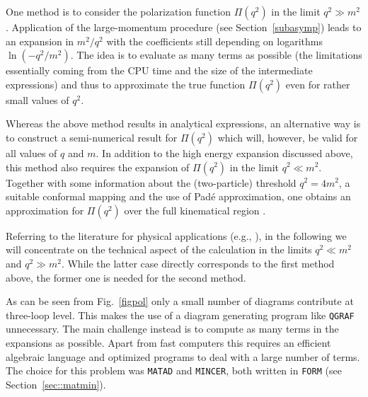 One method is to consider the polarization function $\Pi(q^2)$ in the
limit $q^2\gg m^2$. Application of the large-momentum procedure (see
Section~\ref{subasymp}) leads to an expansion in $m^2/q^2$ with the
coefficients still depending on logarithms $\ln(-q^2/m^2)$.  The idea is
to evaluate as many terms as possible (the limitations essentially
coming from the CPU time and the size of the intermediate expressions)
and thus to approximate the true function $\Pi(q^2)$ even for rather
small values of $q^2$.

Whereas the above method results in analytical expressions, an
alternative way is to construct a semi-numerical result for $\Pi(q^2)$
which will, however, be valid for all values of $q$ and $m$. In addition
to the high energy expansion discussed above, this method also requires
the expansion of $\Pi(q^2)$ in the limit $q^2\ll m^2$.  Together
with some information about the (two-particle) threshold $q^2=4m^2$, a
suitable conformal mapping and the use of Pad\'e approximation, one
obtains an approximation for $\Pi(q^2)$ over the full kinematical region
\cite{CheKueSte96,CheHarSte98}.

Referring to the literature for physical applications (e.g.,
\cite{ckk96,chkst98}), in the following we will concentrate on the
technical aspect of the calculation in the limits $q^2\ll m^2$ and
$q^2\gg m^2$. While the latter case directly corresponds to the first
method above, the former one is needed for the second method.

As can be seen from Fig.~\ref{figpol} only a small number of diagrams
contribute at three-loop level. This makes the use of a diagram generating
program like {\tt QGRAF} unnecessary.  The main challenge instead is to
compute as many terms in the expansions as possible.  Apart from fast
computers this requires an efficient algebraic language and optimized
programs to deal with a large number of terms. The choice for this
problem was {\tt MATAD} and {\tt MINCER}, both written in {\tt FORM}
(see Section~\ref{sec::matmin}).

